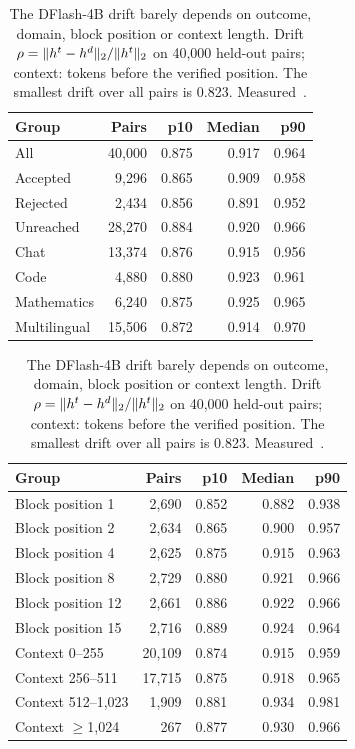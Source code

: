 \begin{table}[htbp]
\tablefont\centering
\caption{The DFlash-4B drift barely depends on outcome, domain, block position or context length. Drift $\rho=\lVert h^t-h^d\rVert_2/\lVert h^t\rVert_2$ on 40,000 held-out pairs; context: tokens before the verified position. The smallest drift over all pairs is 0.823. Measured~.}
\label{tab:rho-groups}
\vskip 0.05in
\begin{tabular}[t]{@{}lrrrr@{}}\toprule
Group & Pairs & p10 & Median & p90\\\midrule
All & 40,000 & 0.875 & 0.917 & 0.964\\\addlinespace
Accepted & 9,296 & 0.865 & 0.909 & 0.958\\
Rejected & 2,434 & 0.856 & 0.891 & 0.952\\
Unreached & 28,270 & 0.884 & 0.920 & 0.966\\\addlinespace
Chat & 13,374 & 0.876 & 0.915 & 0.956\\
Code & 4,880 & 0.880 & 0.923 & 0.961\\
Mathematics & 6,240 & 0.875 & 0.925 & 0.965\\
Multilingual & 15,506 & 0.872 & 0.914 & 0.970\\\bottomrule
\end{tabular}\hspace{3em}%
\begin{tabular}[t]{@{}lrrrr@{}}\toprule
Group & Pairs & p10 & Median & p90\\\midrule
Block position 1 & 2,690 & 0.852 & 0.882 & 0.938\\
Block position 2 & 2,634 & 0.865 & 0.900 & 0.957\\
Block position 4 & 2,625 & 0.875 & 0.915 & 0.963\\
Block position 8 & 2,729 & 0.880 & 0.921 & 0.966\\
Block position 12 & 2,661 & 0.886 & 0.922 & 0.966\\
Block position 15 & 2,716 & 0.889 & 0.924 & 0.964\\\addlinespace
Context 0--255 & 20,109 & 0.874 & 0.915 & 0.959\\
Context 256--511 & 17,715 & 0.875 & 0.918 & 0.965\\
Context 512--1,023 & 1,909 & 0.881 & 0.934 & 0.981\\
Context $\ge$1,024 & 267 & 0.877 & 0.930 & 0.966\\\bottomrule
\end{tabular}
\end{table}

